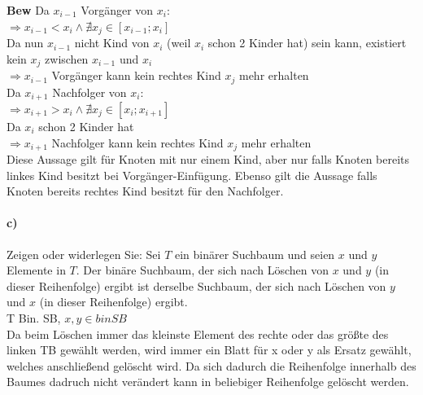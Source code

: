 \documentclass[paper=a4, fontsize=11pt]{scrartcl}
\numberwithin{equation}{section}
\numberwithin{figure}{section}
\numberwithin{table}{section}
\begin{document}
\textbf{Bew} 
Da $x_{i-1}$ Vorgänger von $x_{i}$: \\

$\Rightarrow x_{i-1} < x_{i} \wedge \nexists x_{j} \in [x_{i-1};x_{i}]$ \\

Da nun $x_{i-1}$ nicht Kind von $x_{i}$ (weil $x_{i}$ schon 2 Kinder hat) sein kann, existiert kein $x_{j}$ zwischen $x_{i-1}$ und $x_{i}$ \\

$\Rightarrow x_{i-1}$ Vorgänger kann kein rechtes Kind $x_{j}$ mehr erhalten \\

Da $x_{i+1}$ Nachfolger von $x_{i}$: \\

$\Rightarrow x_{i+1} > x_{i} \wedge \nexists x_{j} \in [x_{i};x_{i+1}]$ \\

Da $x_{i}$ schon 2 Kinder hat \\

$\Rightarrow x_{i+1}$ Nachfolger kann kein rechtes Kind $x_{j}$ mehr erhalten \\

Diese Aussage gilt für Knoten mit nur einem Kind, aber nur falls Knoten bereits linkes Kind besitzt bei Vorgänger-Einfügung. Ebenso gilt die Aussage falls Knoten bereits rechtes Kind besitzt für den Nachfolger.

\paragraph{c)}Zeigen oder widerlegen Sie: Sei $T$ ein binärer Suchbaum und seien $x$ und $y$ Elemente in $T$. Der binäre Suchbaum, der sich nach Löschen von $x$ und $y$ (in dieser Reihenfolge) ergibt ist derselbe Suchbaum, der sich nach Löschen von $y$ und $x$ (in dieser Reihenfolge) ergibt. \\

T Bin. SB, $x,y \in binSB$ \\

Da beim Löschen immer das kleinste Element des rechte oder das größte des linken TB gewählt werden, wird immer ein Blatt für x oder y als Ersatz gewählt, welches anschließend gelöscht wird. Da sich dadurch die Reihenfolge innerhalb des Baumes dadruch nicht verändert kann in beliebiger Reihenfolge gelöscht werden.

\end{document}
